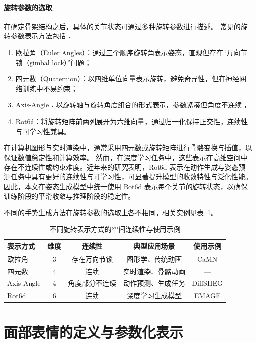 \paragraph{旋转参数的选取}
在确定骨架结构之后，具体的关节状态可通过多种旋转参数进行描述。
常见的旋转参数表示方法包括：

\begin{enumerate}
\item 欧拉角（Euler Angles）：通过三个顺序旋转角表示姿态，直观但存在“万向节锁（gimbal lock）”问题；
\item 四元数（Quaternion）：以四维单位向量表示旋转，避免奇异性，但在神经网络训练中不易约束；
\item Axis-Angle：以旋转轴与旋转角度组合的形式表示，参数紧凑但角度不连续；
\item Rot6d\cite{rot6d}：将旋转矩阵前两列展开为六维向量，通过归一化保持正交性，连续性与可学习性兼具。
\end{enumerate}

在计算机图形与实时渲染中，通常采用四元数或旋转矩阵进行骨骼变换与插值，以保证数值稳定性和计算效率。
然而，在深度学习任务中，这些表示在高维空间中存在不连续性或约束难度。近年来的研究表明\cite{rot6d}，Rot6d 表示在动作生成与姿态预测任务中具有更好的连续性与可学习性，可显著提升模型的收敛特性与泛化性能。
因此，本文在姿态生成模型中统一使用 Rot6d 表示每个关节的旋转状态，以确保训练阶段的平滑收敛与推理阶段的稳定性。

不同的手势生成方法在旋转参数的选取上各不相同，相关实例见表~\ref{fig:rotation_comparison}。

\begin{table}[htbp]
\centering
\caption{不同旋转表示方式的空间连续性与使用示例}
\label{fig:rotation_comparison}
\begin{tabular}{@{}lcccc@{}}
\toprule
\textbf{表示方式} & \textbf{维度} & \textbf{连续性} & \textbf{典型应用场景} & \textbf{使用示例} \\ \midrule
欧拉角 & 3 & 存在万向节锁 & 图形学、传统动画 & CaMN\cite{beatcamn} \\
四元数 & 4 & 连续 & 实时渲染、骨骼动画 & — \\
Axis-Angle & 4 & 角度部分不连续 & 动作预测、生成任务 & DiffSHEG\cite{diffsheg} \\
Rot6d & 6 & 连续 & 深度学习生成模型 & EMAGE\cite{emage} \\ \bottomrule
\end{tabular}
\end{table}

\section{面部表情的定义与参数化表示}

